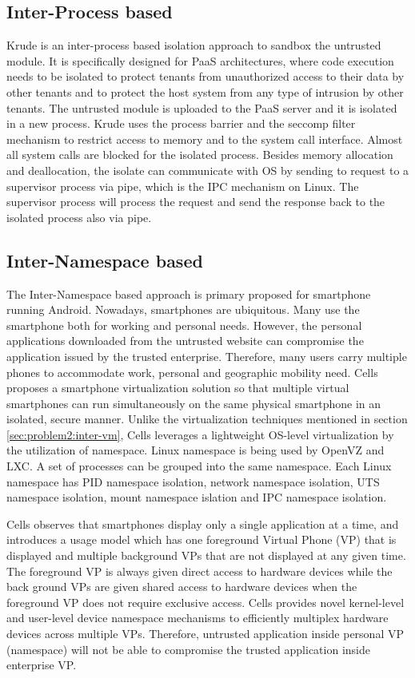 \subsection{Inter-Process based}
\label{sec:problem2:inter-process}

Krude \etal \cite{Krude} is an inter-process based isolation approach to sandbox
the untrusted module. It is specifically designed for PaaS architectures, where
code execution needs to be isolated to protect tenants from unauthorized access
to their data by other tenants and to protect the host system from any type of
intrusion by other tenants. The untrusted module is uploaded to the PaaS server
and it is isolated in a new process. Krude \etal uses the process barrier and
the seccomp filter mechanism to restrict access to memory and to the system call
interface. Almost all system calls are blocked for the isolated process. Besides
memory allocation and deallocation, the isolate can communicate with OS by
sending to request to a supervisor process via pipe, which is the IPC mechanism
on Linux. The supervisor process will process the request and send the response
back to the isolated process also via pipe.

\subsection{Inter-Namespace based}
\label{sec:problem2:inter-namespace}

The Inter-Namespace based approach is primary proposed for smartphone running
Android. Nowadays, smartphones are ubiquitous. Many use the smartphone both for
working and personal needs. However, the personal applications downloaded from
the untrusted website can compromise the application issued by the trusted
enterprise. Therefore, many users carry multiple phones to accommodate work,
personal and geographic mobility need. Cells proposes a smartphone
virtualization solution so that multiple virtual smartphones can run
simultaneously on the same physical smartphone in an isolated, secure manner.
Unlike the virtualization techniques mentioned in section
\ref{sec:problem2:inter-vm}, Cells leverages a lightweight OS-level
virtualization by the utilization of namespace. Linux namespace is being used by
OpenVZ and LXC. A set of processes can be grouped into the same namespace. Each
Linux namespace has PID namespace isolation, network namespace isolation, UTS
namespace isolation, mount namespace islation and IPC namespace isolation.

Cells observes that smartphones display only a single application at a time, and
introduces a usage model which has one foreground Virtual Phone (VP) that is
displayed and multiple background VPs that are not displayed at any given time.
The foreground VP is always given direct access to hardware devices while the
back ground VPs are given shared access to hardware devices when the foreground
VP does not require exclusive access. Cells provides novel kernel-level and
user-level device namespace mechanisms to efficiently multiplex hardware devices
across multiple VPs. Therefore, untrusted application inside personal VP
(namespace) will not be able to compromise the trusted application inside
enterprise VP. 

